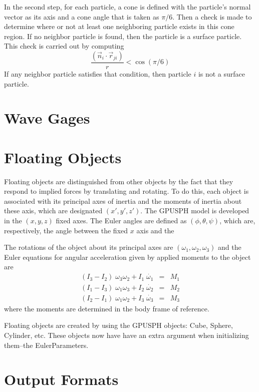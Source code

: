 \documentclass[12pt]{memoir}
\begin{document}
{{{In the second step, for each particle, a cone is defined with the
particle's normal vector as its axis and a cone angle that is taken as
$\pi/6$. Then a check is made to determine where or not at least one
neighboring particle exists in this cone region. If no neighbor
particle is found, then the particle is a surface particle. This check
is carried out by computing \[\frac{(\vec{n}_i \cdot \vec{r}_{ji})}{r} <
\cos (\pi/6)\]If any neighbor particle satisfies that condition, then
particle $i$ is not a surface particle.


\iffalse
\begin{figure}[h]
\centering{%
\texttt{[image: SurfaceDetect1.png]}%
}
\caption{Surface particles in red for the DamBreak3D.cc problem.}
\end{figure}
\else
{}
\fi

\section{Wave Gages}

\section{Floating Objects}

Floating objects are distinguished from other objects by the fact that
they respond to implied forces by translating and rotating. To do this,
each object is associated with its principal axes of inertia and the
moments of inertia about these axis, which are designated $(x',y',z')$.
The GPUSPH model is developed in the $(x,y,z)$ fixed axes. The Euler
angles are defined as $(\phi, \theta, \psi)$, which are, respectively,
the angle between the fixed $x$ axis and the

The rotations of the object about its principal axes are $(\omega_1,
\omega_2, \omega_3)$ and the Euler equations for angular acceleration
given by applied moments to the object are \begin{eqnarray} (I_3 - I_2)
\;\omega_3\omega_2 + I_1 \; \dot{{\omega_1}} &=& M_1 \\ (I_1-I_3)
\;\omega_1 \omega_3 + I_2 \;\dot{{\omega_2}} &=& M_2\\ (I_2-I_1)
\;\omega_1 \omega_2 + I_3 \;\dot{{\omega_3}} &=& M_3 \end{eqnarray}
where the moments are determined in the body frame of reference.


Floating objects are created by using the GPUSPH objects: Cube, Sphere,
Cylinder, etc. These objects now have have an extra argument when
initializing them--the EulerParameters. \section{Output Formats}

}}}
\end{document}
